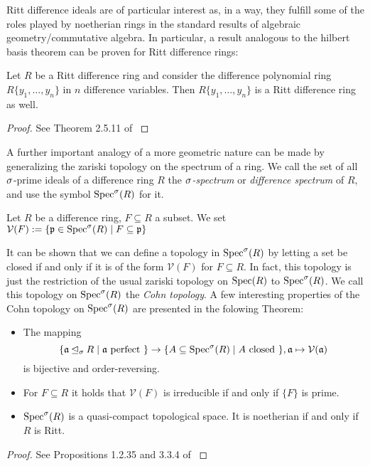 Ritt difference ideals are of particular interest as, in a way, they fulfill some of the roles played by noetherian rings in the standard results of algebraic geometry/commutative algebra.
In particular, a result analogous to the hilbert basis theorem can be proven for Ritt difference rings:

\begin{theorem}
Let $R$ be a Ritt difference ring and consider the difference polynomial ring $R\{y_1, \ldots, y_n\}$ in $n$ difference variables. Then $R\{y_1, \ldots, y_n\}$ is a Ritt difference ring as well.
\begin{proof} See Theorem 2.5.11 of \cite{levin} \end{proof}
\end{theorem}

A further important analogy of a more geometric nature can be made by generalizing the zariski topology on the spectrum of a ring. 
We call the set of all $\sigma$-prime ideals of a difference ring $R$ the \emph{$\sigma$-spectrum} or \emph{difference spectrum}  of $R$, and use the symbol $\operatorname{Spec}^\sigma(R)$ for it.

\begin{defn}
Let $R$ be a difference ring, $F \subseteq R$ a subset. We set $\mathcal{V}(F) := \{ \mathfrak{p} \in \operatorname{Spec}^\sigma(R) \mid F \subseteq \mathfrak{p} \}$
\end{defn}

It can be shown that we can define a topology in $\operatorname{Spec}^\sigma(R)$ by letting a set be closed if and only if it is of the form $\mathcal{V}(F)$ for $F \subseteq R$. 
In fact, this topology is just the restriction of the usual zariski topology on $\operatorname{Spec}(R)$ to $\operatorname{Spec}^\sigma(R)$.
We call this topology on $\operatorname{Spec}^\sigma(R)$ the \emph{Cohn topology}. A few interesting properties of the Cohn topology on $\operatorname{Spec}^\sigma(R)$ are presented in the folowing Theorem:

\begin{prop}
\begin{itemize}
Let $R$ be a difference ring. Then: 
\item The mapping $$\{ \mathfrak{a} \unlhd_{\sigma} R \mid \mathfrak{a}\text{ perfect }\} \rightarrow \{ A \subseteq \operatorname{Spec}^\sigma(R) \mid A \text{ closed }\}, \mathfrak{a} \mapsto \mathcal{V}(\mathfrak{a})$$
 is bijective and order-reversing.
\item For $F \subseteq R$ it holds that $\mathcal{V}(F)$ is irreducible if and only if $\{F\}$ is prime.
\item $\operatorname{Spec}^\sigma(R)$ is a quasi-compact topological space. It is noetherian if and only if $R$ is Ritt.
\end{itemize}
\begin{proof} See Propositions 1.2.35 and 3.3.4 of \cite{wibmer} \end{proof}
\end{prop}

